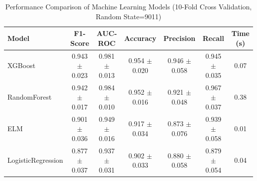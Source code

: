 \begin{table}[htbp]
\centering
\caption{Performance Comparison of Machine Learning Models (10-Fold Cross Validation, Random State=9011)}
\label{tab:model_comparison}
\begin{tabular}{lcccccc}
\toprule
\textbf{Model} & \textbf{F1-Score} & \textbf{AUC-ROC} & \textbf{Accuracy} & \textbf{Precision} & \textbf{Recall} & \textbf{Time (s)} \\
\midrule
XGBoost & 0.943 $\pm$ 0.023 & 0.981 $\pm$ 0.013 & 0.954 $\pm$ 0.020 & 0.946 $\pm$ 0.058 & 0.945 $\pm$ 0.035 & 0.07 \\
RandomForest & 0.942 $\pm$ 0.017 & 0.984 $\pm$ 0.010 & 0.952 $\pm$ 0.016 & 0.921 $\pm$ 0.048 & 0.967 $\pm$ 0.037 & 0.38 \\
ELM & 0.901 $\pm$ 0.036 & 0.949 $\pm$ 0.016 & 0.917 $\pm$ 0.034 & 0.873 $\pm$ 0.076 & 0.939 $\pm$ 0.058 & 0.01 \\
LogisticRegression & 0.877 $\pm$ 0.037 & 0.937 $\pm$ 0.031 & 0.902 $\pm$ 0.033 & 0.880 $\pm$ 0.058 & 0.879 $\pm$ 0.054 & 0.04 \\
\bottomrule
\end{tabular}
\end{table}